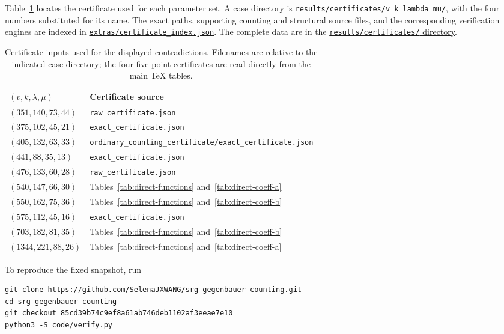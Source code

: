 \documentclass[11pt]{article}
\theoremstyle{remark}
\numberwithin{equation}{section}
\begin{document}
Table~\ref{tab:certificate-files} locates the certificate used for each
parameter set. A case directory is
\nolinkurl{results/certificates/v_k_lambda_mu/}, with the four numbers
substituted for its name. The exact paths, supporting counting and
structural source files, and the corresponding verification engines
are indexed in
\href{https://github.com/SelenaJXWANG/srg-gegenbauer-counting/blob/85cd39b74c9ef8a61ab746deb1102af3eeae7e10/extras/certificate_index.json}{\nolinkurl{extras/certificate_index.json}}.
The complete data are in the
\href{https://github.com/SelenaJXWANG/srg-gegenbauer-counting/tree/85cd39b74c9ef8a61ab746deb1102af3eeae7e10/results/certificates}{\texttt{results/certificates/} directory}.
\begin{table}[H]
\centering\small
\caption{Certificate inputs used for the displayed contradictions.
Filenames are relative to the indicated case directory; the four
five-point certificates are read directly from the main TeX tables.}
\label{tab:certificate-files}
\begin{tabular}{@{}lp{}@{}}
\toprule
$(v,k,\lambda,\mu)$ & Certificate source\\
\midrule
$(351,140,73,44)$ & \nolinkurl{raw_certificate.json}\\
$(375,102,45,21)$ & \nolinkurl{exact_certificate.json}\\
$(405,132,63,33)$ & \nolinkurl{ordinary_counting_certificate/exact_certificate.json}\\
$(441,88,35,13)$ & \nolinkurl{exact_certificate.json}\\
$(476,133,60,28)$ & \nolinkurl{raw_certificate.json}\\
$(540,147,66,30)$ & Tables~\ref{tab:direct-functions} and~\ref{tab:direct-coeff-a}\\
$(550,162,75,36)$ & Tables~\ref{tab:direct-functions} and~\ref{tab:direct-coeff-b}\\
$(575,112,45,16)$ & \nolinkurl{exact_certificate.json}\\
$(703,182,81,35)$ & Tables~\ref{tab:direct-functions} and~\ref{tab:direct-coeff-b}\\
$(1344,221,88,26)$ & Tables~\ref{tab:direct-functions} and~\ref{tab:direct-coeff-a}\\
\bottomrule
\end{tabular}
\end{table}
To reproduce the fixed snapshot, run
\begingroup\small
\begin{verbatim}
git clone https://github.com/SelenaJXWANG/srg-gegenbauer-counting.git
cd srg-gegenbauer-counting
git checkout 85cd39b74c9ef8a61ab746deb1102af3eeae7e10
python3 -S code/verify.py
\end{verbatim}
\end{document}
